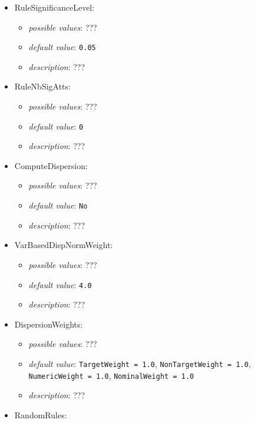 \documentclass{article}
\begin{document}
\begin{itemize}
    \item RuleSignificanceLevel:
           \begin{itemize}
                \item \emph{possible values}: ???
                \item \emph{default value}: \texttt{0.05}
                \item \emph{description}: ???
           \end{itemize}
    \item RuleNbSigAtts:
           \begin{itemize}
                \item \emph{possible values}: ???
                \item \emph{default value}: \texttt{0}
                \item \emph{description}: ???
           \end{itemize}
    \item ComputeDispersion:
           \begin{itemize}
                \item \emph{possible values}: ???
                \item \emph{default value}: \texttt{No}
                \item \emph{description}: ???
           \end{itemize}
    \item VarBasedDispNormWeight:
           \begin{itemize}
                \item \emph{possible values}: ???
                \item \emph{default value}: \texttt{4.0}
                \item \emph{description}: ???
           \end{itemize}
    \item DispersionWeights:
           \begin{itemize}
                \item \emph{possible values}: ???
                \item \emph{default value}: \texttt{TargetWeight = 1.0}, \texttt{NonTargetWeight = 1.0}, \texttt{NumericWeight = 1.0}, \texttt{NominalWeight = 1.0}
                \item \emph{description}: ???
           \end{itemize}
    \item RandomRules:
           \begin{itemize}

\end{itemize}
\end{itemize}
\end{document}
